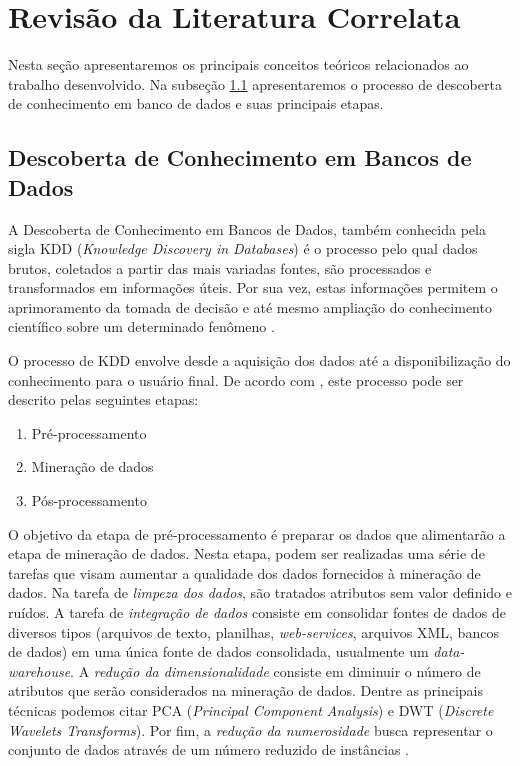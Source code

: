 \section{Revisão da Literatura Correlata} \label{sec:fundamentacao_teorica}

Nesta seção apresentaremos os principais conceitos teóricos relacionados ao
trabalho desenvolvido. Na subseção \ref{subsec:descoberta_conhecimento_bd}
apresentaremos o processo de descoberta de conhecimento em banco de dados e
suas principais etapas. 

\subsection{Descoberta de Conhecimento em Bancos de Dados}
	\label{subsec:descoberta_conhecimento_bd}

A Descoberta de Conhecimento em Bancos de Dados, também conhecida pela sigla KDD 
(\emph{Knowledge Discovery in Databases}) é o processo pelo qual dados brutos,
coletados a partir das mais variadas fontes, são processados e transformados em
informações úteis. Por sua vez, estas informações permitem o aprimoramento da
tomada de decisão e até mesmo ampliação do conhecimento científico sobre um
determinado fenômeno \cite{tan2009introducao}.

O processo de KDD envolve desde a aquisição dos dados até a disponibilização do
conhecimento para o usuário final. De acordo com \cite{tan2009introducao},
este processo pode ser descrito pelas seguintes etapas:

\begin{enumerate}
    \item Pré-processamento
    \item Mineração de dados
    \item Pós-processamento
\end{enumerate}

O objetivo da etapa de pré-processamento é preparar os dados que alimentarão a 
etapa de mineração de dados. Nesta etapa, podem ser realizadas uma série de
tarefas que visam aumentar a qualidade dos dados fornecidos à mineração de
dados. Na tarefa de \emph{limpeza dos dados}, são tratados atributos sem valor
definido e ruídos. A tarefa de \emph{integração de dados} consiste
em consolidar fontes de dados de diversos tipos (arquivos de texto, planilhas,
\emph{web-services}, arquivos XML, bancos de dados) em uma única fonte de dados
consolidada, usualmente um \emph{data-warehouse}. A \emph{redução da
dimensionalidade} consiste em diminuir o número de atributos que serão
considerados na mineração de dados. Dentre as principais técnicas podemos citar
PCA (\emph{Principal Component Analysis}) e DWT (\emph{Discrete Wavelets
Transforms}). Por fim, a \emph{redução da numerosidade} busca representar o
conjunto de dados através de um número reduzido de instâncias
\cite{han2011data}.

